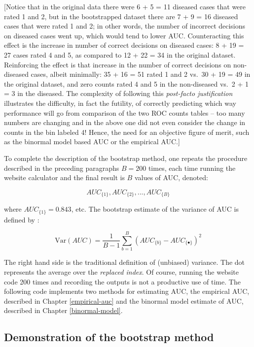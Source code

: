 \documentclass[
]{book}
\begin{document}
{[}Notice that in the original data there were 6 + 5 = 11 diseased cases that were rated 1 and 2, but in the bootstrapped dataset there are 7 + 9 = 16 diseased cases that were rated 1 and 2; in other words, the number of incorrect decisions on diseased cases went up, which would tend to lower AUC. Counteracting this effect is the increase in number of correct decisions on diseased cases: 8 + 19 = 27 cases rated 4 and 5, as compared to 12 + 22 = 34 in the original dataset. Reinforcing the effect is that increase in the number of correct decisions on non-diseased cases, albeit minimally: 35 + 16 = 51 rated 1 and 2 vs.~30 + 19 = 49 in the original dataset, and zero counts rated 4 and 5 in the non-diseased vs.~2 + 1 = 3 in the diseased. The complexity of following this \emph{post-facto justification} illustrates the difficulty, in fact the futility, of correctly predicting which way performance will go from comparison of the two ROC counts tables -- too many numbers are changing and in the above one did not even consider the change in counts in the bin labeled 4! Hence, the need for an objective figure of merit, such as the binormal model based AUC or the empirical AUC.{]}

To complete the description of the bootstrap method, one repeats the procedure described in the preceding paragraphs \(B = 200\) times, each time running the website calculator and the final result is \(B\) values of AUC, denoted:

\[AUC_{\{1\}},AUC_{\{2\}},...,AUC_{\{B\}}\]

where \(AUC_{\{1\}}=0.843\), etc. The bootstrap estimate of the variance of AUC is defined by \citep{RN2261}:

\begin{equation} 
\text{Var}\left ( AUC \right )=\frac{1}{B-1}\sum_{b=1}^{B}\left ( AUC_{\{b\}}-AUC_{\{ \bullet\}} \right )^2
\label{eq:sources-of-variabilityVar-bs}
\end{equation}

The right hand side is the traditional definition of (unbiased) variance. The dot represents the average over the \emph{replaced index}. Of course, running the website code 200 times and recording the outputs is not a productive use of time. The following code implements two methods for estimating AUC, the empirical AUC, described in Chapter \ref{empirical-auc} and the binormal model estimate of AUC, described in Chapter \ref{binormal-model}.

\hypertarget{demonstration-of-the-bootstrap-method}{%
\subsection{Demonstration of the bootstrap method}\label{demonstration-of-the-bootstrap-method}}
\end{document}
